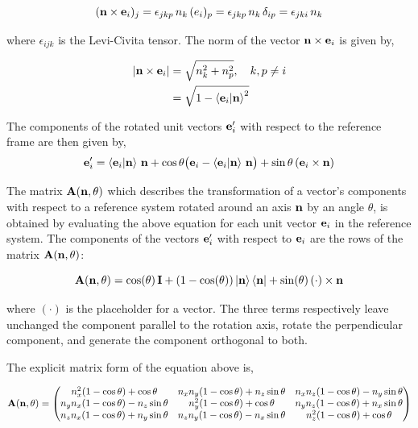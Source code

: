 \documentclass[12pt]{article}
\begin{document}
\[
  (\vb{n} \times \vb{e}_i)_j = \epsilon_{jkp}\, n_k\,(e_i)_p = \epsilon_{jkp}\, n_k\,\delta_{ip} = \epsilon_{jki}\, n_k
\]

where $\epsilon_{ijk}$ is the Levi-Civita tensor. The norm of the vector $\vb{n} \times \vb{e}_i$ is given by,

\begin{align}
  |\vb{n} \times \vb{e}_i| &= \sqrt{n_k^2 + n_p^2}, \quad k, p \neq i \\
                            &= \sqrt{1 - \ip{\vb{e}_i}{\vb{n}}^2}
\end{align}

The components of the rotated unit vectors $\vb{e}'_i$ with respect to the reference frame
are then given by,
\[
  \vb{e}'_i = \ip{\vb{e}_i}{\vb{n}}\,\vb{n}
    +\cos\theta\bigl(
\vb e_i
-
\ip{\vb e_i}{\vb n}\,\vb n
\bigr)
    + \sin\theta\,(\vb{e}_i \times \vb{n})
\]

The matrix $\vb{A}(\vb{n}, \theta)$ which describes the transformation of a vector's
components with respect to a reference system rotated around an axis $\vb{n}$ by an angle
$\theta$, is obtained by evaluating the above equation for each unit vector $\vb{e}_i$ in
the reference system. The components of the vectors $\vb{e}'_i$ with respect to $\vb{e}_i$
are the rows of the matrix $\vb{A}(\vb{n}, \theta)$:

\begin{equation}
  \vb{A}(\vb{n},\theta) = \cos(\theta)\,\vb{I} + (1-\cos(\theta))\ket{\vb{n}}\bra{\vb{n}}
    + \sin(\theta)\,(\cdot) \times \vb{n}
  \label{kinematics:rodrigues-formula}
\end{equation}

where $(\cdot)$ is the placeholder for a vector. The three terms respectively leave unchanged the component parallel to
the rotation axis, rotate the perpendicular component, and generate the component orthogonal to both.\par

The explicit matrix form of the equation above is,

\[
  \vb{A}(\vb{n},\theta) =
  \begin{pmatrix}
    n_x^2(1-\cos\theta)+\cos\theta        & n_x n_y(1-\cos\theta)+n_z\sin\theta   & n_x n_z(1-\cos\theta)-n_y\sin\theta \\
    n_y n_x(1-\cos\theta)-n_z\sin\theta   & n_y^2(1-\cos\theta)+\cos\theta        & n_y n_z(1-\cos\theta)+n_x\sin\theta \\
    n_z n_x(1-\cos\theta)+n_y\sin\theta   & n_z n_y(1-\cos\theta)-n_x\sin\theta   & n_z^2(1-\cos\theta)+\cos\theta
  \end{pmatrix}
\]
\end{document}
